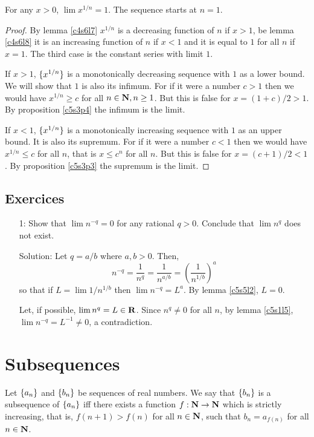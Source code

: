\begin{lem}\label{c5s5l6}
For any $x > 0$, $\lim x^{1/n} = 1$. The sequence starts at $n = 1$.
\end{lem}
\begin{proof}
By lemma \ref{c4s6l7} $x^{1/n}$ is a decreasing function of $n$ if $x > 1$,
be lemma \ref{c4s6l8} it is an increasing function of $n$ if $x < 1$ and it
is equal to $1$ for all $n$ if $x = 1$. The third case is the constant series
with limit $1$.

If $x > 1$, $\{x^{1/n}\}$ is a monotonically decreasing sequence with $1$ 
as a lower bound. We will show that $1$ is also its infimum. For if it were
a number $c > 1$ then we would have $x^{1/n} \ge c$ for all $n \in \mathbf{N}, n 
\ge 1$. But this is false for $x = (1 + c)/2 > 1$. By proposition 
\ref{c5s3p4} the infimum is the limit.

If $x < 1$, $\{x^{1/n}\}$ is a monotonically increasing sequence with $1$
as an upper bound. It is also its supremum. For if it were a number $c < 1$
then we would have $x^{1/n} \le c$ for all $n$, that is $x \le c^n$ for all
$n$. But this is false for $x = (c + 1)/2 < 1$. By proposition \ref{c5s3p3}
the supremum is the limit.
\end{proof}

\subsection{Exercices}
\begin{enumerate}
\item[1:] Show that $\lim n^{-q} = 0$ for any rational $q > 0$. Conclude
 that $\lim n^q$ does not exist.
\item[Solution:] Let $q = a/b$ where $a, b > 0$. Then, 
\[
n^{-q} = \frac{1}{n^q} = \frac{1}{n^{a/b}} = 
\left(\frac{1}{n^{1/b}}\right)^{a}
\]
so that if $L = \lim 1/n^{1/b}$ then $\lim n^{-q} = L^a$. By lemma 
\ref{c5s5l2}, $L = 0$.

Let, if possible, $\lim n^q = L \in \mathbf{R}$. Since $n^q \ne 0$ for all $n$,
by lemma \ref{c5s1l5}, $\lim n^{-q} = L^{-1} \ne 0$, a contradiction.
\end{enumerate}

\section{Subsequences}\label{c5s6}
\begin{defn}\label{c5s6d1}
Let $\{a_n\}$ and $\{b_n\}$ be sequences of real numbers. We say that 
$\{b_n\}$ is a subsequence of $\{a_n\}$ iff there exists a function
$f: \mathbf{N} \rightarrow \mathbf{N}$ which is strictly increasing, that is, $f(n+1)
> f(n)$ for all $n \in \mathbf{N}$, such that $b_n = a_{f(n)}$ for all $n \in
\mathbf{N}$.
\end{defn}

